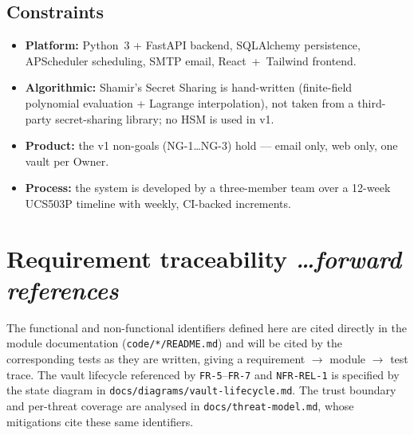 \documentclass[11pt,a4paper]{article}
\newcommand{\BvrHint}[1]{%
  {\normalfont\normalsize\itshape\hfill #1}}
\newcommand{\ReqID}[1]{\texttt{#1}}
\begin{document}
\subsection{Constraints}
\begin{itemize}[leftmargin=0.7cm]
  \item \textbf{Platform:} Python~3 + FastAPI backend, SQLAlchemy persistence,
    APScheduler scheduling, SMTP email, React~+~Tailwind frontend.
  \item \textbf{Algorithmic:} Shamir's Secret Sharing is hand-written (finite-field
    polynomial evaluation + Lagrange interpolation), not taken from a
    third-party secret-sharing library; no HSM is used in v1.
  \item \textbf{Product:} the v1 non-goals (NG-1\ldots NG-3) hold --- email
    only, web only, one vault per Owner.
  \item \textbf{Process:} the system is developed by a three-member team over a 12-week UCS503P
    timeline with weekly, CI-backed increments.
\end{itemize}

\section{Requirement traceability \BvrHint{\ldots forward references}}
The functional and non-functional identifiers defined here are cited directly
in the module documentation (\texttt{code/*/README.md}) and will be cited by
the corresponding tests as they are written, giving a requirement
$\rightarrow$ module $\rightarrow$ test trace. The vault lifecycle referenced
by \ReqID{FR-5}--\ReqID{FR-7} and \ReqID{NFR-REL-1} is specified by the state
diagram in \texttt{docs/diagrams/vault-lifecycle.md}. The trust boundary and
per-threat coverage are analysed in \texttt{docs/threat-model.md}, whose
mitigations cite these same identifiers.
\end{document}
